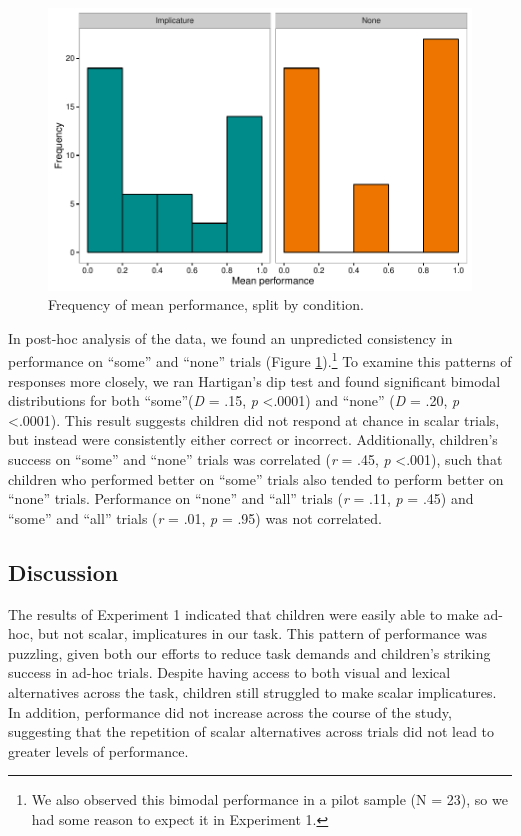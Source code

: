 \documentclass[man]{apa2}
\begin{document}
\begin{figure}
 \begin{center}
  \includegraphics[width=6in]{figures/exp1_hist.pdf}
  \caption{\label{fig:imp_hist} Frequency of mean performance, split by condition.}
 \end{center}
\end{figure}

In post-hoc analysis of the data, we found an unpredicted consistency in performance on ``some'' and ``none'' trials (Figure \ref{fig:imp_hist}).\footnote{We also observed this bimodal performance in a pilot sample (N = 23), so we had some reason to expect it in Experiment 1.}  To examine this patterns of responses more closely, we ran Hartigan's dip test and found significant bimodal distributions for both ``some''(\textit{D} = .15, \textit{p} \textless  .0001) and ``none'' (\textit{D} = .20, \textit{p} \textless  .0001). This result suggests children did not respond at chance in scalar trials, but instead were consistently either correct or incorrect. Additionally, children's success on ``some'' and ``none'' trials was correlated (\textit{r} = .45, \textit{p} \textless  .001), such that children who performed better on ``some'' trials also tended to perform better on ``none'' trials. Performance on ``none'' and ``all'' trials (\textit{r} = .11, \textit{p} = .45) and ``some'' and ``all'' trials (\textit{r} = .01, \textit{p} = .95) was not correlated.

\subsection{Discussion}

The results of Experiment 1 indicated that children were easily able to make ad-hoc, but not scalar, implicatures in our task. This pattern of performance was puzzling, given both our efforts to reduce task demands and children's striking success in ad-hoc trials. Despite having access to both visual and lexical alternatives across the task, children still struggled to make scalar implicatures. In addition, performance did not increase across the course of the study, suggesting that the repetition of scalar alternatives across trials did not lead to greater levels of performance.
\end{document}
